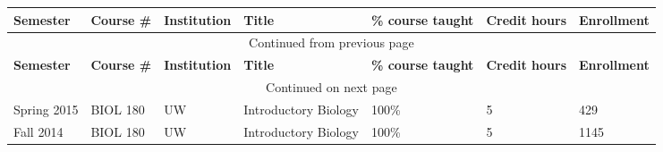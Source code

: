 {\sffamily\small
{}
\begin{longtable}[l]{ p{0.79in} p{0.65in} p{0.60in} p{1.7in} p{0.58in} p{0.34in} p{0.70in} }
    \hline
    \textbf{Semester} & \textbf{Course \#} & \textbf{Institution} & \textbf{Title} & \textbf{\% course taught} & \textbf{Credit hours} & \textbf{Enrollment} \\
    \hline
    \endfirsthead
    \multicolumn{7}{c}{{Continued from previous page}} \\
    \hline
    \textbf{Semester} & \textbf{Course \#} & \textbf{Institution} & \textbf{Title} & \textbf{\% course taught} & \textbf{Credit hours} & \textbf{Enrollment} \\
    \hline
    \endhead
    \hline \multicolumn{7}{c}{{Continued on next page}} \\
    \endfoot
    \hline
    \endlastfoot
    Spring 2015 & BIOL 180 & UW & Introductory Biology & 100\% & 5 & 429 \\
    Fall 2014 & BIOL 180 & UW & Introductory Biology & 100\% & 5 & 1145 \\
\end{longtable}
}
